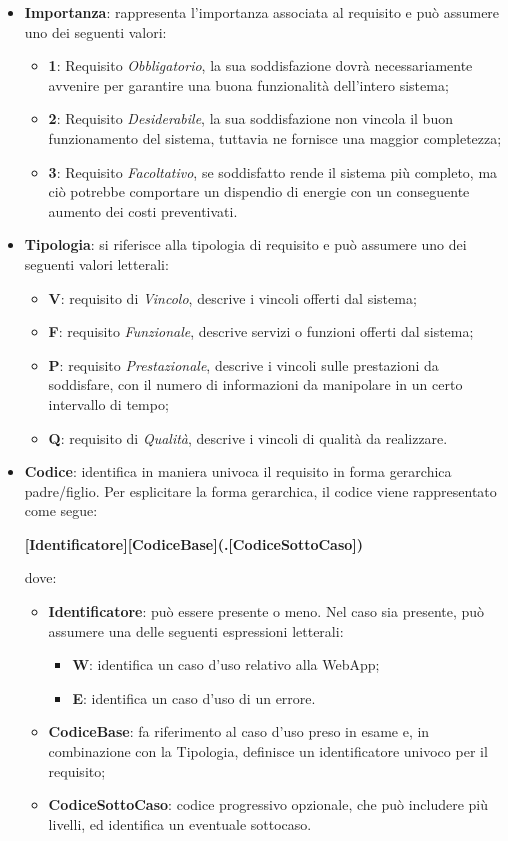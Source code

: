 \begin{itemize}
\item \textbf{Importanza}: rappresenta l'importanza associata al requisito e può assumere uno dei seguenti valori:
\begin{itemize}
	
	\item \textbf{1}: Requisito \textit{Obbligatorio}, la sua soddisfazione dovrà necessariamente avvenire per garantire una buona funzionalità dell’intero sistema;
	\item \textbf{2}: Requisito \textit{Desiderabile}, la sua soddisfazione non vincola il buon funzionamento del sistema, tuttavia ne fornisce una maggior completezza;
	\item \textbf{3}: Requisito \textit{Facoltativo}, se soddisfatto rende il sistema più completo, ma ciò potrebbe comportare un dispendio di energie con un conseguente aumento dei costi preventivati.
\end{itemize}
\item \textbf{Tipologia}: si riferisce alla tipologia di requisito e può assumere uno dei seguenti valori letterali:
\begin{itemize}
	\item \textbf{V}: requisito di \textit{Vincolo}, descrive i vincoli offerti dal sistema;
	\item \textbf{F}: requisito \textit{Funzionale}, descrive servizi o funzioni offerti dal sistema;
	\item \textbf{P}: requisito \textit{Prestazionale}, descrive i vincoli sulle prestazioni da soddisfare, con il numero di informazioni da manipolare in un certo intervallo di tempo;
	\item \textbf{Q}: requisito di \textit{Qualità}, descrive i vincoli di qualità da realizzare.
\end{itemize}
\item \textbf{Codice}: identifica in maniera univoca il requisito in forma gerarchica padre/figlio.
Per esplicitare la forma gerarchica, il codice viene rappresentato come segue:
\begin{center}
\textbf{[Identificatore][CodiceBase](.[CodiceSottoCaso])}
\end{center}
dove: 
\begin{itemize}
	\item \textbf{Identificatore}: può essere presente o meno. Nel caso sia presente, può assumere una delle seguenti espressioni letterali:
		\begin{itemize}
			\item \textbf{W}: identifica un caso d'uso relativo alla WebApp;
			\item \textbf{E}: identifica un caso d'uso di un errore.
		\end{itemize}
	\item \textbf{CodiceBase}: fa riferimento al caso d’uso preso in esame e, in combinazione con la Tipologia, definisce un identificatore univoco per il requisito;
	\item \textbf{CodiceSottoCaso}: codice progressivo opzionale, che può includere più livelli, ed identifica un eventuale sottocaso.
\end{itemize}
\end{itemize}

